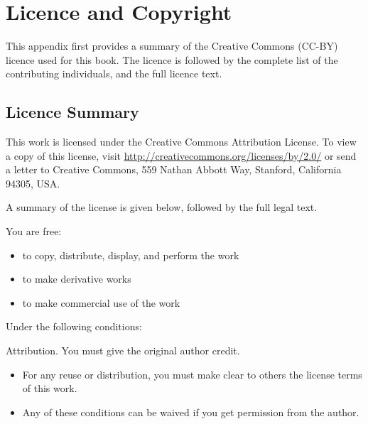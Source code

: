 \documentclass[a4paper,10pt,twoside]{book}
\begin{document}
  \sloppy
\fi


\chapter{Licence and Copyright}


This appendix first provides a summary of the Creative Commons (CC-BY) licence used for this book. 
The licence is followed by the complete list of the contributing individuals, and the full licence text.

\section{Licence Summary}

This work is licensed under the Creative Commons Attribution License.
To view a copy of this license, visit 
\url{http://creativecommons.org/licenses/by/2.0/} or send a letter to
Creative Commons, 559 Nathan Abbott Way, Stanford, California 94305, USA.

\noindent A summary of the license is given below, followed by the full legal text.

\noindent You are free:

\begin{itemize}
  \item to copy, distribute, display, and perform the work
  \item to make derivative works
  \item to make commercial use of the work
\end{itemize}

\noindent Under the following conditions:
	
\noindent Attribution. You must give the original author credit.

\begin{itemize}
\item For any reuse or distribution, you must make clear to others the
      license terms of this work.

\item Any of these conditions can be waived if you get permission from
      the author.
\end{itemize}
\end{document}
